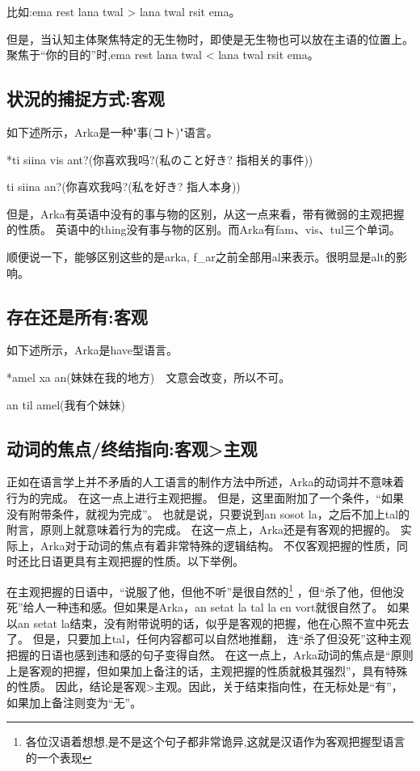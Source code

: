 比如:\quad ema rest lana twal > lana twal rsit ema。

但是，当认知主体聚焦特定的无生物时，即使是无生物也可以放在主语的位置上。
聚焦于“你的目的”时,ema rest lana twal < lana twal rsit ema。

\subsection{状況的捕捉方式:客观}

如下述所示，Arka是一种"事(コト)"语言。

*ti siina vis ant?(你喜欢我吗?(私のこと好き? 指相关的事件))

ti siina an?(你喜欢我吗?(私を好き? 指人本身))

但是，Arka有英语中没有的事与物的区别，从这一点来看，带有微弱的主观把握的性质。
英语中的thing没有事与物的区别。而Arka有fam、vis、tul三个单词。

顺便说一下，能够区别这些的是arka, f\_ar之前全部用al来表示。很明显是alt的影响。

\subsection{存在还是所有:客观}

如下述所示，Arka是have型语言。

*amel xa an(妹妹在我的地方)　文意会改变，所以不可。

an til amel(我有个妹妹)

\subsection{动词的焦点/终结指向:客观>主观}

正如在语言学上并不矛盾的人工语言的制作方法中所述，Arka的动词并不意味着行为的完成。
在这一点上进行主观把握。
但是，这里面附加了一个条件，“如果没有附带条件，就视为完成”。
也就是说，只要说到an sosot la，之后不加上tal的附言，原则上就意味着行为的完成。
在这一点上，Arka还是有客观的把握的。
实际上，Arka对于动词的焦点有着非常特殊的逻辑结构。
不仅客观把握的性质，同时还比日语更具有主观把握的性质。以下举例。

在主观把握的日语中，“说服了他，但他不听”是很自然的\footnote{各位汉语着想想,是不是这个句子都非常诡异,这就是汉语作为客观把握型语言的一个表现}
，但“杀了他，但他没死”给人一种违和感。但如果是Arka，an setat la tal la en vort就很自然了。
如果以an setat la结束，没有附带说明的话，似乎是客观的把握，他在心照不宣中死去了。
但是，只要加上tal，任何内容都可以自然地推翻，
连“杀了但没死”这种主观把握的日语也感到违和感的句子变得自然。
在这一点上，Arka动词的焦点是“原则上是客观的把握，但如果加上备注的话，主观把握的性质就极其强烈”，具有特殊的性质。
因此，结论是客观>主观。因此，关于结束指向性，在无标处是“有”，如果加上备注则变为“无”。

